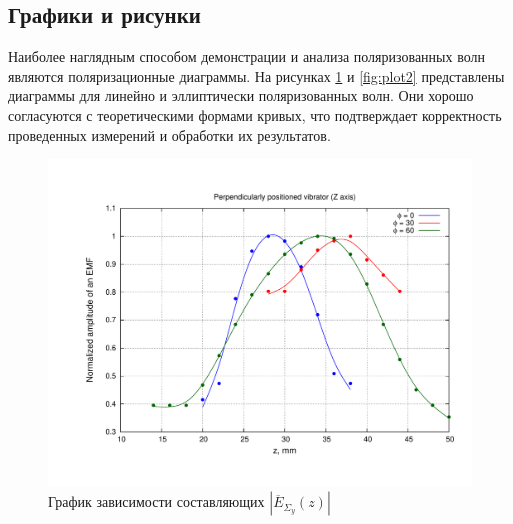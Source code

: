 \documentclass[11pt,a4paper,oneside, titlepage,reqno]{amsproc}
\begin{document}
\subsection{Графики и рисунки}
Наиболее наглядным способом демонстрации и анализа поляризованных волн являются
поляризационные диаграммы. На рисунках \ref{fig:plot1} и \ref{fig:plot2}
представлены диаграммы для линейно и эллиптически поляризованных волн.
Они хорошо согласуются с теоретическими формами кривых, что
подтверждает корректность проведенных измерений и обработки их результатов.\\

\begin{figure}[hb!]
    \begin{center}
        \includegraphics[width=\textwidth]{plot1.pdf}
    \end{center}
    \vspace {-20 pt}
    \caption{График зависимости составляющих $|\overline{E}_{\Sigma_y}(z)|$}
    \label{fig:plot1}
\end{figure}
\end{document}
